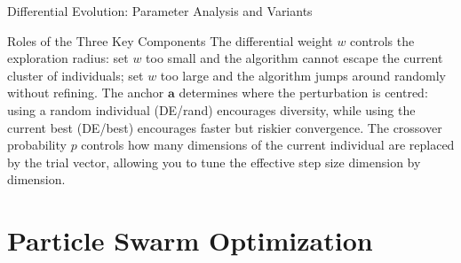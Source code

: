 \documentclass[aspectratio=169,10pt]{beamer}
\newcommand{\ba}{\mathbf{a}}
\begin{document}
\begin{frame}[allowframebreaks]{Differential Evolution: Parameter Analysis and Variants}
  \begin{alertblock}{Roles of the Three Key Components}
    The differential weight $w$ controls the exploration radius: set
    $w$ too small and the algorithm cannot escape the current cluster
    of individuals; set $w$ too large and the algorithm jumps around
    randomly without refining.  The anchor $\ba$ determines where
    the perturbation is centred: using a random individual (DE/rand)
    encourages diversity, while using the current best (DE/best)
    encourages faster but riskier convergence.  The crossover
    probability $p$ controls how many dimensions of the current
    individual are replaced by the trial vector, allowing you to
    tune the effective step size dimension by dimension.
  \end{alertblock}

\end{frame}

\section{Particle Swarm Optimization}
\end{document}
